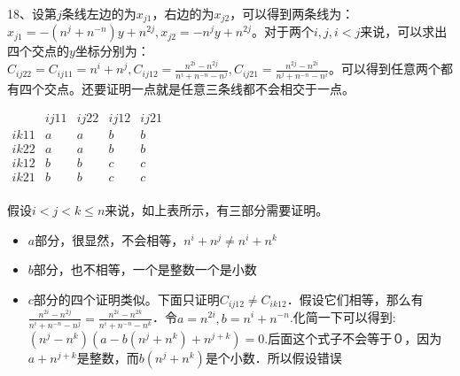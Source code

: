 \documentclass[onecolumn]{article}
\begin{document}
18、设第$j$条线左边的为$x_{j1}$，右边的为$x_{j2}$，可以得到两条线为：$x_{j1}=-(n^{j}+n^{-n})y+n^{2j},x_{j2}=-n^{j}y+n^{2j}$。对于两个$i,j,i<j$来说，可以求出四个交点的$y$坐标分别为：$C_{ij22}=C_{ij11}=n^{i}+n^{j},C_{ij12}=\frac{n^{2i}-n^{2j}}{n^{i}+n^{-n}-n^{j}},C_{ij21}=\frac{n^{2j}-n^{2i}}{n^{j}+n^{-n}-n^{i}}$。可以得到任意两个都有四个交点。还要证明一点就是任意三条线都不会相交于一点。\par
$\begin{matrix} 
     & ij11 & ij22 & ij12 & ij21 \\ 
ik11 & a & a & b & b \\ 
ik22 & a & a & b & b \\ 
ik12 & b & b & c & c \\ 
ik21 & b & b & c & c \\ 
\end{matrix}$ \par
假设$i<j<k\leq n$来说，如上表所示，有三部分需要证明。\par
\begin{itemize}
	\item $a$部分，很显然，不会相等，$n^{i}+n^{j}\ne n^{i}+n^{k}$
    \item $b$部分，也不相等，一个是整数一个是小数
    \item $c$部分的四个证明类似。下面只证明$C_{ij12} \neq C_{ik12}$．假设它们相等，那么有$\frac{n^{2i}-n^{2j}}{n^{i}+n^{-n}-n^{j}}=\frac{n^{2i}-n^{2k}}{n^{i}+n^{-n}-n^{k}}$．令$a=n^{2i},b=n^{i}+n^{-n}$.化简一下可以得到:$(n^{j}-n^{k})(a-b(n^{j}+n^{k})+n^{j+k})=0$.后面这个式子不会等于０，因为$a+n^{j+k}$是整数，而$b(n^{j}+n^{k})$是个小数．所以假设错误
\end{itemize}
\par ~\\
\end{document}
